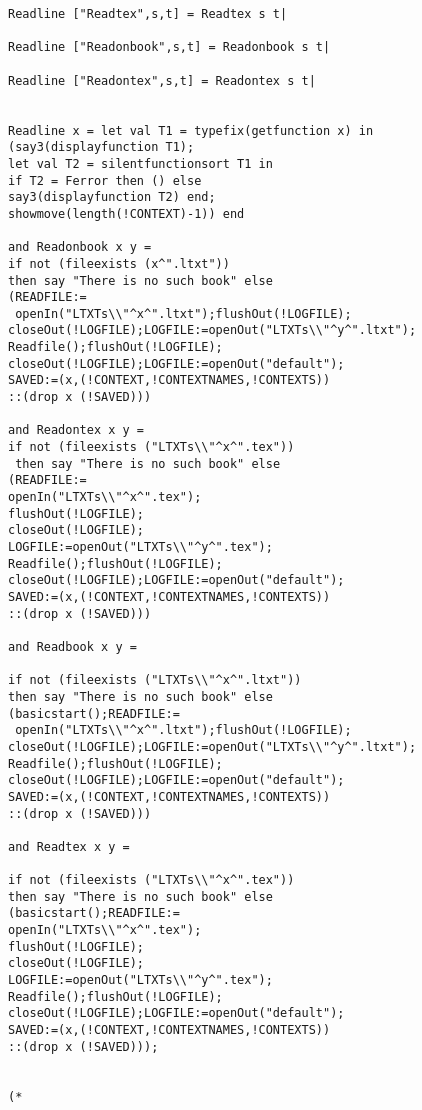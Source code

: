 \documentclass[12pt]{article}
\begin{document}
\begin{verbatim}
Readline ["Readtex",s,t] = Readtex s t|

Readline ["Readonbook",s,t] = Readonbook s t|

Readline ["Readontex",s,t] = Readontex s t|


Readline x = let val T1 = typefix(getfunction x) in
(say3(displayfunction T1);
let val T2 = silentfunctionsort T1 in
if T2 = Ferror then () else
say3(displayfunction T2) end;
showmove(length(!CONTEXT)-1)) end 

and Readonbook x y = 
if not (fileexists (x^".ltxt")) 
then say "There is no such book" else
(READFILE:=
 openIn("LTXTs\\"^x^".ltxt");flushOut(!LOGFILE);
closeOut(!LOGFILE);LOGFILE:=openOut("LTXTs\\"^y^".ltxt");
Readfile();flushOut(!LOGFILE);
closeOut(!LOGFILE);LOGFILE:=openOut("default");
SAVED:=(x,(!CONTEXT,!CONTEXTNAMES,!CONTEXTS))
::(drop x (!SAVED)))

and Readontex x y = 
if not (fileexists ("LTXTs\\"^x^".tex"))
 then say "There is no such book" else
(READFILE:= 
openIn("LTXTs\\"^x^".tex");
flushOut(!LOGFILE);
closeOut(!LOGFILE);
LOGFILE:=openOut("LTXTs\\"^y^".tex");
Readfile();flushOut(!LOGFILE);
closeOut(!LOGFILE);LOGFILE:=openOut("default");
SAVED:=(x,(!CONTEXT,!CONTEXTNAMES,!CONTEXTS))
::(drop x (!SAVED)))

and Readbook x y = 

if not (fileexists ("LTXTs\\"^x^".ltxt")) 
then say "There is no such book" else
(basicstart();READFILE:=
 openIn("LTXTs\\"^x^".ltxt");flushOut(!LOGFILE);
closeOut(!LOGFILE);LOGFILE:=openOut("LTXTs\\"^y^".ltxt");
Readfile();flushOut(!LOGFILE);
closeOut(!LOGFILE);LOGFILE:=openOut("default");
SAVED:=(x,(!CONTEXT,!CONTEXTNAMES,!CONTEXTS))
::(drop x (!SAVED)))

and Readtex x y = 

if not (fileexists ("LTXTs\\"^x^".tex")) 
then say "There is no such book" else
(basicstart();READFILE:= 
openIn("LTXTs\\"^x^".tex");
flushOut(!LOGFILE);
closeOut(!LOGFILE);
LOGFILE:=openOut("LTXTs\\"^y^".tex");
Readfile();flushOut(!LOGFILE);
closeOut(!LOGFILE);LOGFILE:=openOut("default");
SAVED:=(x,(!CONTEXT,!CONTEXTNAMES,!CONTEXTS))
::(drop x (!SAVED)));


(*

\end{verbatim}
\end{document}
